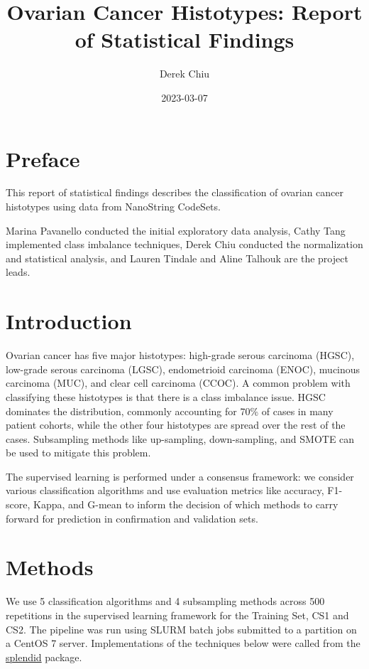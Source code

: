 \documentclass[
]{report}
\title{Ovarian Cancer Histotypes: Report of Statistical Findings}
\author{Derek Chiu}
\date{2023-03-07}
\begin{document}
\maketitle

{
\hypersetup{linkcolor=}
\setcounter{tocdepth}{1}
\tableofcontents
}
\listoffigures
\listoftables
\hypertarget{preface}{%
\chapter*{Preface}\label{preface}}

This report of statistical findings describes the classification of ovarian cancer histotypes using data from NanoString CodeSets.

Marina Pavanello conducted the initial exploratory data analysis, Cathy Tang implemented class imbalance techniques, Derek Chiu conducted the normalization and statistical analysis, and Lauren Tindale and Aline Talhouk are the project leads.

\hypertarget{introduction}{%
\chapter{Introduction}\label{introduction}}

Ovarian cancer has five major histotypes: high-grade serous carcinoma (HGSC), low-grade serous carcinoma (LGSC), endometrioid carcinoma (ENOC), mucinous carcinoma (MUC), and clear cell carcinoma (CCOC). A common problem with classifying these histotypes is that there is a class imbalance issue. HGSC dominates the distribution, commonly accounting for 70\% of cases in many patient cohorts, while the other four histotypes are spread over the rest of the cases. Subsampling methods like up-sampling, down-sampling, and SMOTE can be used to mitigate this problem.

The supervised learning is performed under a consensus framework: we consider various classification algorithms and use evaluation metrics like accuracy, F1-score, Kappa, and G-mean to inform the decision of which methods to carry forward for prediction in confirmation and validation sets.

\hypertarget{methods}{%
\chapter{Methods}\label{methods}}

We use 5 classification algorithms and 4 subsampling methods across 500 repetitions in the supervised learning framework for the Training Set, CS1 and CS2. The pipeline was run using SLURM batch jobs submitted to a partition on a CentOS 7 server. Implementations of the techniques below were called from the \href{https://alinetalhouk.github.io/splendid/}{splendid} package.
\end{document}
